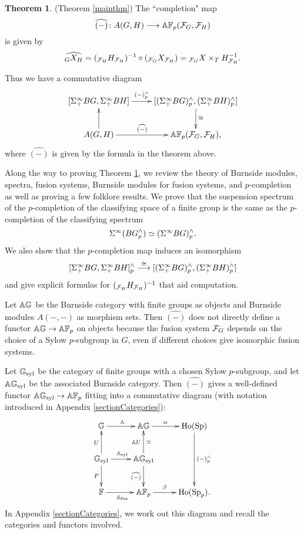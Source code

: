 \documentclass[10pt]{amsart}
\theoremstyle{definition}
\DeclareMathOperator{\Sp}{Sp}
\DeclareMathOperator{\Ho}{Ho}
\newtheorem{theorem}{Theorem}[section]
\begin{document}
\begin{theorem} \label{mainone} (Theorem \ref{mainthm})
The ``completion" map
\[
\widehat{(-)} \colon A(G,H) \overset{}{\longrightarrow} \mathbb{A} \mathbb{F}_p(\mathcal{F}_G,\mathcal{F}_H)
\]
is given by
\[
\widehat{_{G} X_{H}} = (_{\mathcal{F}_H}H_{\mathcal{F}_H})^{-1} \circ (_{\mathcal{F}_G}X_{\mathcal{F}_H}) = {}_{\mathcal{F}_G}X \times_T H^{-1}_{\mathcal{F}_H}.
\]
\end{theorem}


Thus we have a commutative diagram
\[
\xymatrix{[\Sinfp BG, \Sinfp BH] \ar[r]^-{(-)^{\wedge}_{p}} & [(\Sinfp BG)^{\wedge}_{p}, (\Sinfp BH)^{\wedge}_{p}] \ar[d]^{\cong} \\ A(G,H) \ar[u] \ar[r]^-{\widehat{(-)}} & \AF(\cF_G, \cF_H),}
\]
where $\widehat{(-)}$ is given by the formula in the theorem above.

Along the way to proving Theorem \ref{mainone}, we review the theory of Burnside modules, spectra, fusion systems, Burnside modules for fusion systems, and $p$-completion as well as proving a few folklore results. We prove that the suspension spectrum of the $p$-completion of the classifying space of a finite group is the same as the $p$-completion of the classifying spectrum
\[
\Sigma^{\infty} (BG^{\wedge}_{p}) \simeq (\Sigma^{\infty} BG)^{\wedge}_{p}.
\]
We also show that the $p$-completion map induces an isomorphism
\[
[\Sigma^{\infty}_{+} BG, \Sigma^{\infty}_{+} BH]^{\wedge}_{p} \overset{\cong}{\longrightarrow} [(\Sigma^{\infty}_{+} BG)^{\wedge}_{p}, (\Sigma^{\infty}_{+} BH)^{\wedge}_{p}]
\]
and give explicit formulas for $(_{\mathcal{F}_H}H_{\mathcal{F}_H})^{-1}$ that aid computation.

Let $\mathbb{A} \mathbb{G}$ be the Burnside category with finite groups as objects and Burnside modules $A(-,-)$ as morphism sets. Then $\widehat{(-)}$ does not directly define a functor $\mathbb{A} \mathbb{G} \to \mathbb{A} \mathbb{F}_p$ on objects because the fusion system $\mathcal{F}_G$ depends on the choice of a Sylow $p$-subgroup in $G$, even if different choices give isomorphic fusion systems.

Let $\mathbb{G}_{\text{syl}}$ be the category of finite groups with a chosen Sylow $p$-subgroup, and let $\mathbb{A} \mathbb{G}_{\text{syl}}$ be the associated Burnside category. Then $\widehat{(-)}$ gives a well-defined functor $\mathbb{A} \mathbb{G}_{\text{syl}} \to \mathbb{A} \mathbb{F}_p$ fitting into a commutative diagram (with notation introduced in Appendix \ref{sectionCategories}):
\begin{equation}\label{eqDiagramOfCats}
\xymatrix{\G \ar[r]^{\A}  &\AG \ar[r]^-{\al}& \Ho(\Sp) \ar[dd]^-{(-)^{\wedge}_{p}} \\ \Gs \ar[u]^{U} \ar[r]^{\As} \ar[d]_{F} & \AGs \ar[u]^-{\AU}_-{\simeq}  \ar[d]_-{\widehat{(-)}} &  \\ \F \ar[r]_{\Af} &\AF \ar[r]^-{\beta} & \Ho(\Sp_p).}
\end{equation}
In Appendix \ref{sectionCategories}, we work out this diagram and recall the categories and functors involved.
\end{document}
